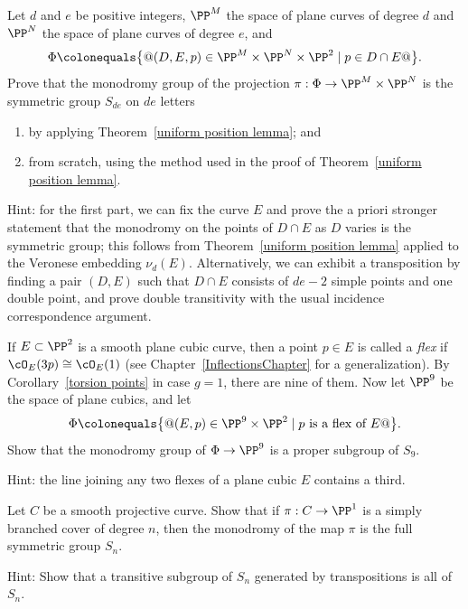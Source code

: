 \begin{exercise}
Let $d$ and $e$ be positive integers, $\PP^M$ the space of plane curves
of degree $d$ and $\PP^N$ the space of plane curves of degree $e$, and
$$
\Phi \colonequals  \big\{@ (D, E, p) \in \PP^M \times \PP^N \times \PP^2 \mid
p \in D \cap E@\big \}.
$$
Prove that the monodromy group of the projection $\pi : \Phi \to \PP^M
\times \PP^N$ is the symmetric group $S_{de}$ on $de$ letters
\begin{enumerate}
\item by applying Theorem~\ref{uniform position lemma}; and
\item from scratch, using the method used in the proof of
Theorem~\ref{uniform position lemma}.
\end{enumerate}

Hint: for the first part, we can fix the curve $E$ and prove the
a priori stronger statement that the monodromy on the points of
$D \cap E$ as $D$ varies is the symmetric group; this follows from
Theorem~\ref{uniform position lemma} applied to the Veronese embedding
$\nu_d(E)$. Alternatively, we can exhibit a transposition by finding a
pair $(D,E)$ such that $D \cap E$ consists of $de-2$ simple points and
one double point, and prove double transitivity with the usual incidence
correspondence argument.
\end{exercise}

\begin{exercise}
If $E \subset \PP^2$ is a smooth plane cubic curve, then a point $p \in E$
is called a 
\textit{flex}
%
if $\cO_E(3p) \cong \cO_E(1)$ (see Chapter~\ref{InflectionsChapter} for a generalization). By Corollary~\ref{torsion
points} in case $g=1$, there are nine of them. Now let $\PP^9$ be the
space of 
plane cubics, 
%
and let
$$
\Phi \colonequals  \big\{@(E, p) \in \PP^9 \times \PP^2 \mid p \text{ is a
flex of } E@ \big \}.
$$
Show that the monodromy group of $\Phi \to \PP^9$ is a proper subgroup
of $S_9$.

Hint: the line joining any two flexes of a plane cubic $E$ contains
a third.
\end{exercise}

\begin{exercise}
Let $C$ be a smooth projective curve. Show that if $\pi : C \to \PP^1$
is a simply branched cover of degree $n$, then the monodromy of the map
$\pi$ is the full symmetric group $S_n$.

Hint: Show that a transitive subgroup of $S_n$ generated by 
transpositions
%
is all of $S_n$.
%
\end{exercise}

